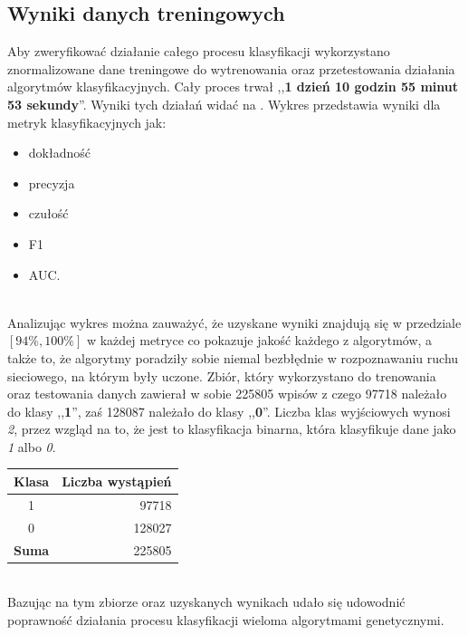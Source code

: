\subsection{Wyniki danych treningowych}
Aby zweryfikować działanie całego procesu klasyfikacji wykorzystano znormalizowane dane treningowe do wytrenowania oraz przetestowania działania algorytmów klasyfikacyjnych. Cały proces trwał ,,\textbf{1 dzień 10 godzin 55 minut 53 sekundy}''. Wyniki tych działań widać na . Wykres przedstawia wyniki dla metryk klasyfikacyjnych jak:
\begin{itemize}
    \item dokładność
    \item precyzja
    \item czułość
    \item F1
    \item AUC.
\end{itemize}
\ \\
Analizując wykres można zauważyć, że uzyskane wyniki znajdują się w przedziale $[94\%, 100\%]$ w każdej metryce co pokazuje jakość każdego z algorytmów, a także to, że algorytmy poradziły sobie niemal bezbłędnie w rozpoznawaniu ruchu sieciowego, na którym były uczone. Zbiór, który wykorzystano do trenowania oraz testowania danych zawierał w sobie 225805 wpisów z czego 97718 należało do klasy ,,\textbf{1}'', zaś 128087 należało do klasy ,,\textbf{0}''. Liczba klas wyjściowych wynosi \textit{2}, przez wzgląd na to, że jest to klasyfikacja binarna, która klasyfikuje dane jako \textit{1} albo \textit{0}.

\begin{table}[H]
    \centering
    \label{tab:trening-data-label}
    \begin{tabular}{|c|r|}
        \hline
        \textbf{Klasa} & \textbf{Liczba wystąpień} \\ \hline
        1              & 97718                     \\ \hline
        0              & 128027                    \\ \hline
        \textbf{Suma}  & 225805                    \\ \hline
    \end{tabular}
\end{table}
\ \\
Bazując na tym zbiorze oraz uzyskanych wynikach udało się udowodnić poprawność działania procesu klasyfikacji wieloma algorytmami genetycznymi.

